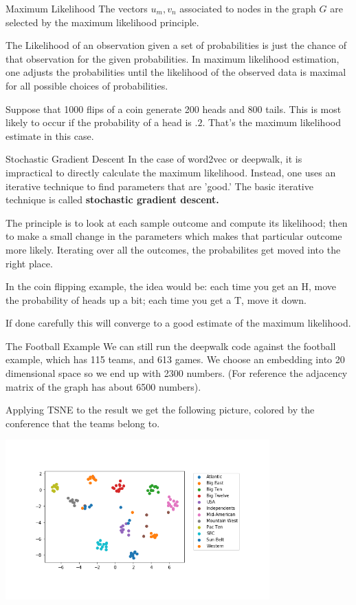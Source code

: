 \documentclass{beamer}
\begin{document}
  \begin{frame}{Maximum Likelihood}
    The vectors $u_m,v_n$ associated to nodes in the graph $G$ are selected by the maximum likelihood principle.

    \bigskip\noindent
    The Likelihood of an observation given a set of probabilities is just the chance of that observation for the given probabilities. In maximum likelihood estimation, one adjusts the probabilities until the likelihood of the observed data is maximal for all possible choices of probabilities.

    \bigskip\noindent
    Suppose that  1000 flips of a coin generate 200 heads and 800 tails.  This is most likely to occur if the probability of a head is $.2$.  That's the maximum likelihood estimate in this case.
  \end{frame}
  \begin{frame}{Stochastic Gradient Descent}
    In the case of word2vec or deepwalk, it is impractical to  directly calculate the maximum likelihood. Instead, one uses an iterative technique to find parameters that are 'good.'  The basic iterative technique is called \textbf{stochastic gradient descent.}

    \bigskip\noindent
    The principle is to look at each sample outcome and compute its likelihood; then to make a small change in the parameters which makes that particular outcome more likely.  Iterating over all the outcomes, the probabilites get moved into the right place.

    \bigskip\noindent
    In the coin flipping example, the idea would be: each time you get an H, move the probability of heads up a bit; each time you get a T, move it down.

    \bigskip\noindent
    If done carefully this will converge to a good estimate of the maximum likelihood.
  \end{frame}
  \begin{frame}{The Football Example}
    We can still run the deepwalk code against the football example, which has 115 teams, and 613 games.  We choose
    an embedding into 20 dimensional space so we end up with 2300 numbers.
    (For reference the adjacency matrix of the graph has about 6500 numbers).

    Applying TSNE to the result we get the following picture, colored by the conference that the teams belong to.

    \includegraphics[width=4in]{football_clusters.png}
 \end{frame}
\end{document}
